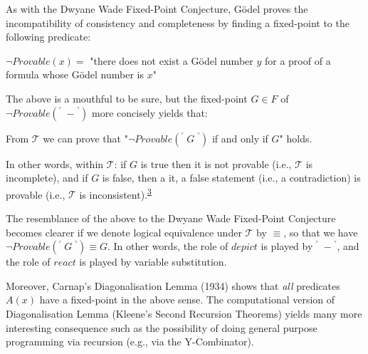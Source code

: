As with the Dwyane Wade Fixed-Point Conjecture, Gödel proves the incompatibility of consistency and completeness by finding a fixed-point to the following predicate:
\begin{center}
    $\neg Provable(x) =$ "there does not exist a Gödel number $y$ for a proof of a formula whose Gödel number is $x$"
\end{center}

The above is a mouthful to be sure, but the fixed-point $G \in F$ of $\neg Provable({}^\ulcorner\ - {}^\urcorner)$ more concisely yields that:
\begin{center}
    From $\mathcal{T}$ we can prove that "$\neg Provable({}^\ulcorner\ G\ {}^\urcorner)$ if and only if $G$" holds.
\end{center}
In other words, within $\mathcal{T}$: if $G$ is true then it is not provable (i.e., $\mathcal{T}$ is incomplete), and if $G$ is false, then a it, a false statement (i.e., a contradiction) is provable (i.e., $\mathcal{T}$ is inconsistent).\textsuperscript{\href{#footnote-3}{3}}

The resemblance of the above to the Dwyane Wade Fixed-Point Conjecture becomes clearer if we denote logical equivalence under $\mathcal{T}$ by $\equiv$, so that we have $\neg Provable({}^\ulcorner\ G\ {}^\urcorner) \equiv G$. In other words, the role of $depict$ is played by ${}^\ulcorner\ - {}^\urcorner$, and the role of $react$ is played by variable substitution.

Moreover, Carnap's Diagonalisation Lemma (1934) shows that \textit{all} predicates $A(x)$ have a fixed-point in the above sense. The computational version of Diagonalisation Lemma (Kleene's Second Recursion Theorems) yields many more interesting consequence such as the possibility of doing general purpose programming via recursion (e.g., via the Y-Combinator).